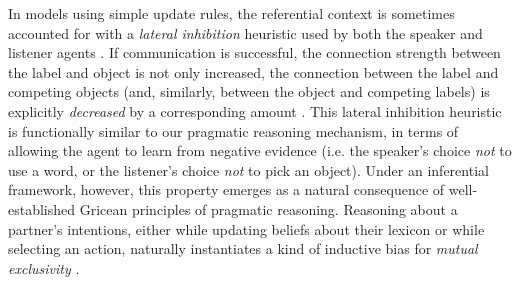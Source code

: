 In models using simple update rules, the referential context is sometimes accounted for with a \emph{lateral inhibition} heuristic used by both the speaker and listener agents \cite{franke2012bidirectional}.
If communication is successful, the connection strength between the label and object is not only increased, the connection between the label and competing objects (and, similarly, between the object and competing labels) is explicitly \emph{decreased} by a corresponding amount \cite<see also>{steels2005coordinating}.
This lateral inhibition heuristic is functionally similar to our pragmatic reasoning mechanism, in terms of allowing the agent to learn from negative evidence (i.e. the speaker's choice \emph{not} to use a word, or the listener's choice \emph{not} to pick an object). 
Under an inferential framework, however, this property emerges as a natural consequence of well-established Gricean principles of pragmatic reasoning.
Reasoning about a partner's intentions, either while updating beliefs about their lexicon or while selecting an action, naturally instantiates a kind of inductive bias for \emph{mutual exclusivity} \cite{gulordava2020one,ohmerreinforcement,FrankGoodmanTenenbaum09_Wurwur}.

